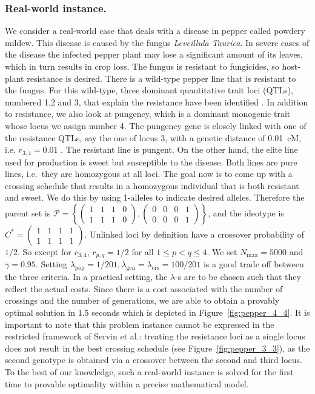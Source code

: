 \documentclass[runningheads]{llncs}
\begin{document}
\subsubsection{Real-world instance.} We consider a real-world case that deals with a
disease in pepper called powdery mildew. This disease is caused by the fungus
\emph{Leveillula Taurica}. In severe cases of the disease the infected pepper plant may lose a
significant amount of its leaves, which in turn results in crop loss. The
fungus is resistant to fungicides, so host-plant resistance is desired.
There is a wild-type pepper line that is resistant to the fungus. For this wild-type, three dominant quantitative trait loci (QTLs), numbered 1,2 and 3, that explain the resistance have been identified \cite{Chifriss:1992}. In addition to resistance, we also look at pungency, which is a dominant monogenic trait whose locus we assign number 4. The pungency gene is closely linked with one of the resistance QTLs, say the one of locus 3, with a genetic distance
of 0.01~cM, i.e. $r_{3,4} = 0.01$ \cite{Haldane:1919}. The resistant line is pungent. On the other hand, the elite line used for production is sweet but susceptible to the disease. Both lines are pure lines, i.e.\ they are homozygous at all loci. The goal now is to come up with a crossing schedule that results in a homozygous individual that is both resistant and sweet. 
We do this by using 1-alleles to indicate desired alleles. Therefore the parent set is 
$\mathcal{P} = \left\{
  \begin{pmatrix}
    1 & 1 & 1 & 0\\
    1 & 1 & 1 & 0
  \end{pmatrix}
  ,
  \begin{pmatrix}
    0 & 0 & 0 & 1\\
    0 & 0 & 0 & 1
  \end{pmatrix}
  \right\}$, and the ideotype is
  $C^* = 
  \begin{pmatrix}
    1 & 1 & 1 & 1\\
    1 & 1 & 1 & 1
  \end{pmatrix}$. Unlinked loci by definition have a crossover probability of $1/2$. So except for $r_{3,4}$, $r_{p,q} = 1/2$ for all $1 \leq p < q \leq 4$. We set $N_\mathrm{max} = 5000$ and $\gamma = 0.95$. Setting $\lambda_\mathrm{pop} = 1/201, \lambda_\mathrm{gen} = \lambda_\mathrm{crs} = 100/201$ is a good trade off between the three criteria. In a practical setting, the $\lambda$-s are to be chosen such that they reflect the actual costs. Since there is a cost associated with the number of crossings and the number of generations, we are able to obtain a provably optimal solution in 1.5 seconds which is depicted in Figure~\ref{fig:pepper_4_4}. It is important to note that this problem instance cannot be expressed in the restricted framework of Servin et al.\cite{Servin:2004}: treating the resistance loci as a single locus does not result in the best crossing schedule (see Figure~\ref{fig:pepper_3_3}), as the second genotype is obtained via a crossover between the second and third locus. To the best of our knowledge, such a real-world instance is solved for the first time to provable optimality within a precise mathematical model.
\end{document}
